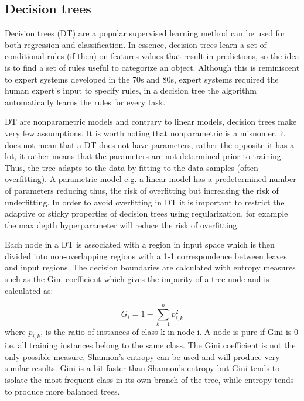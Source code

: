 \documentclass[11pt]{article}
\theoremstyle{definition}
\theoremstyle{remark}
\begin{document}
\subsection{Decision trees}
\label{sse:dectrees}

Decision trees (DT) are a popular supervised learning method can be used for both regression and classification.
In essence, decision trees learn a set of conditional rules (if-then) on features values that result in predictions, so the idea is to find a set of rules useful to categorize an object. Although this is reminiscent to expert systems developed in the 70s and 80s, expert systems required the human expert's input to specify rules, in a decision tree the algorithm automatically learns the rules for every task.

DT are nonparametric models and contrary to linear models, decision trees make very few assumptions. It is worth noting that nonparametric is a misnomer, it does not mean that a DT does not have parameters, rather the opposite it has a lot, it rather means that the parameters are not determined prior to training. Thus, the tree adapts to the data by fitting to the data samples (often overfitting). A parametric model e.g. a linear model has a predetermined number of parameters reducing thus, the risk of overfitting but increasing the risk of underfitting. In order to avoid overfitting in DT it is important to restrict the adaptive or sticky properties of decision trees using regularization, for example the max depth hyperparameter will reduce the risk of overfitting.

Each node in a DT is associated with a region in input space which is then divided into non-overlapping regions with a 1-1 correspondence between leaves and input regions. The decision boundaries are calculated with entropy measures such as the Gini coefficient which gives the impurity of a tree node and is calculated as:

\begin{equation} 
G_i = 1- \sum_{k=1}^{n} p_{i,k}^2
\label{eq:gini}
\end{equation}
where $p_{i,k}$, is the ratio of instances of class k in node i. A node is pure if Gini is 0 i.e. all training instances belong to the same class. The Gini coefficient is not the only possible measure, Shannon's entropy can be used and will produce very similar results. Gini is a bit faster than Shannon's entropy but Gini tends to isolate the most frequent class in its own branch of the tree, while entropy tends to produce more balanced trees. %
 
\end{document}
